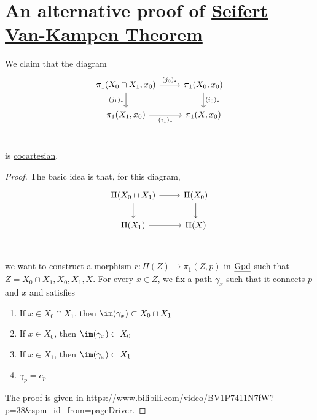 \section{An alternative proof of \hyperref[thm:Seifert-Van-Kampen-Theorem]{Seifert Van-Kampen Theorem}}\label{pf:an-alternative-proof-of-Seifert-Van-Kampen-thm}
\begin{theorem}
	We claim that the diagram
	\[
		\begin{tikzcd}
			{\pi_1(X_0\cap X_1, x_0)} & {\pi_1(X_0, x_0)} \\
			{\pi_1(X_1, x_0)} & {\pi_1(X, x_0)} \\
			\arrow["{(j_0)_\ast}", from=1-1, to=1-2]
			\arrow["{(i_0)_\ast}", from=1-2, to=2-2]
			\arrow["{(i_1)_\ast}"', from=2-1, to=2-2]
			\arrow["{(j_1)_\ast}"', from=1-1, to=2-1]
		\end{tikzcd}
	\]
	is \hyperref[def:cocartesian]{cocartesian}.
\end{theorem}
\begin{proof}
	The basic idea is that, for this diagram,
	\[
		\begin{tikzcd}
			{\Pi(X_0\cap X_1)} & {\Pi(X_0)} \\
			{\Pi(X_1)} & {\Pi(X)} \\
			\arrow[from=1-1, to=1-2]
			\arrow[from=1-2, to=2-2]
			\arrow[from=2-1, to=2-2]
			\arrow[from=1-1, to=2-1]
		\end{tikzcd}
	\]
	we want to construct a \hyperref[def:morphism]{morphism} \(r\colon \Pi (Z)\to \pi _1(Z, p)\) in \(\underline{\mathrm{Gpd}}\) such that
	\(Z = X_0 \cap X_1, X_0, X_1, X\). For every \(x\in Z\), we fix a \hyperref[def:path]{path} \(\gamma _{x} \) such that it connects \(p\) and \(x\) and satisfies
	\begin{enumerate}[(1)]
		\item If \(x\in X_0 \cap X_1\), then \(\im (\gamma _{x} )\subset X_0 \cap X_1\)
		\item If \(x\in X_0\), then \(\im (\gamma _{x} )\subset X_0\)
		\item If \(x\in X_1\), then \(\im (\gamma _{x} )\subset X_1\)
		\item \(\gamma _p = c_p\)
	\end{enumerate}

	The proof is given in \url{https://www.bilibili.com/video/BV1P7411N7fW?p=38&spm_id_from=pageDriver}.
\end{proof}

